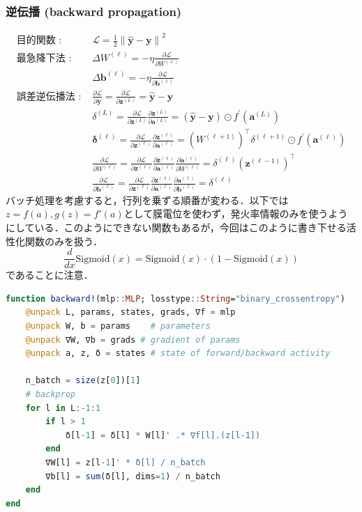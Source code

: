 \subsubsection{逆伝播 (backward propagation)}
\begin{align}
\text{目的関数 : }&\mathcal{L}=\frac{1}{2}\left\|\hat{\mathbf{y}}-\mathbf{y}\right\|^{2}\\
\text{最急降下法 : }&\Delta W^{(\ell)}=-\eta \frac{\partial \mathcal{L}}{\partial W^{(\ell)}}\\
&\Delta \mathbf{b}^{(\ell)}=-\eta \frac{\partial \mathcal{L}}{\partial \mathbf{b}^{(\ell)}}\\
\text{誤差逆伝播法 : }&\frac{\partial \mathcal{L}}{\partial \hat{\mathbf{y}}}=\frac{\partial \mathcal{L}}{\partial \mathbf{z}^{(L)}}=\hat{\mathbf{y}}-\mathbf{y}\\
&\delta^{(L)}=\frac{\partial \mathcal{L}}{\partial \mathbf{z}^{(L)}} \frac{\partial \mathbf{z}^{(L)}}{\partial \mathbf{a}^{(L)}}=\left(\hat{\mathbf{y}}-\mathbf{y}\right) \odot f^{\prime}\left(\mathbf{a}^{(L)}\right)\\
&\mathbf{\delta}^{(\ell)}=\frac{\partial \mathcal{L}}{\partial \mathbf{z}^{(\ell)}} \frac{\partial \mathbf{z}^{(\ell)}}{\partial \mathbf{a}^{(\ell)}}=\left(W^{(\ell+1)}\right)^\top \delta^{(\ell+1)} \odot f^{\prime}\left(\mathbf{a}^{(\ell)}\right)\\
&\frac{\partial \mathcal{L}}{\partial W^{(\ell)}}=\frac{\partial \mathcal{L}}{\partial \mathbf{z}^{(\ell)}} \frac{\partial \mathbf{z}^{(\ell)}}{\partial \mathbf{a}^{(\ell)}} \frac{\partial \mathbf{a}^{(\ell)}}{\partial W^{(\ell)}}=\delta^{(\ell)}\left(\mathbf{z}^{(\ell-1)}\right)^\top\\
&\frac{\partial \mathcal{L}}{\partial \mathbf{b}^{(\ell)}}=\frac{\partial \mathcal{L}}{\partial \mathbf{z}^{(\ell)}} \frac{\partial \mathbf{z}^{(\ell)}}{\partial \mathbf{a}^{(\ell)}} \frac{\partial \mathbf{a}^{(\ell)}}{\partial \mathbf{b}^{(\ell)}}=\delta^{(\ell)}
\end{align}
バッチ処理を考慮すると，行列を乗ずる順番が変わる．以下では$z=f(a), g(z)=f'(a)$として膜電位を使わず，発火率情報のみを使うようにしている．このようにできない関数もあるが，今回はこのように書き下せる活性化関数のみを扱う．
\begin{equation}
\frac{d}{dx} \text{Sigmoid}(x) = \text{Sigmoid}(x) \cdot \left(1 - \text{Sigmoid}(x)\right)
\end{equation}
であることに注意．
\begin{lstlisting}[language=julia]
function backward!(mlp::MLP; losstype::String="binary_crossentropy")
    @unpack L, params, states, grads, ∇f = mlp
    @unpack W, b = params    # parameters
    @unpack ∇W, ∇b = grads # gradient of params
    @unpack a, z, δ = states # state of forward/backward activity

    n_batch = size(z[0])[1]
    # backprop
    for l in L:-1:1
        if l > 1
            δ[l-1] = δ[l] * W[l]' .* ∇f[l].(z[l-1])
        end
        ∇W[l] = z[l-1]' * δ[l] / n_batch
        ∇b[l] = sum(δ[l], dims=1) / n_batch
    end
end
\end{lstlisting}
